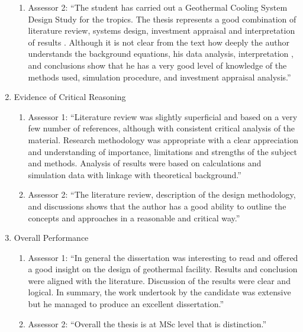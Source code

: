\documentclass[14pt,twoside]{report}
\begin{document}
\begin{enumerate}
\begin{enumerate}
       \item Assessor 2: ``The student has carried out a Geothermal Cooling System Design Study for the tropics. The thesis represents a good combination of literature review, systems design, investment appraisal and interpretation of results . Although it is not clear from the text how deeply the author understands the background equations, his data analysis, interpretation , and conclusions show that he has a very good level of knowledge of the methods used, simulation procedure, and investment appraisal analysis.''
    \end{enumerate}
%  
   \item Evidence of Critical Reasoning
    \begin{enumerate}%
       \item Assessor 1: ``Literature review was slightly superficial and based on a very few number of references, although with consistent critical analysis of the material. Research methodology was appropriate with a clear appreciation and understanding of importance, limitations and strengths of the subject and methods. Analysis of results were based on calculations and simulation data with linkage with theoretical background.''
       \item Assessor 2: ``The literature review, description of the design methodology, and discussions shows that the author has a good ability to outline the concepts and approaches in a reasonable and critical way.''
    \end{enumerate}
%  
   \item Overall Performance
    \begin{enumerate}%
       \item Assessor 1: ``In general the dissertation was interesting to read and offered a good insight on the design of geothermal facility. Results and conclusion were aligned with the literature. Discussion of the results were clear and logical. In summary, the work undertook by the candidate was extensive but he managed to produce an excellent dissertation.''
       \item Assessor 2: ``Overall the thesis is at MSc level that is distinction.''
    \end{enumerate}
%  
\end{enumerate}

\vfill
\clearpage


\bigskip
\end{document}
